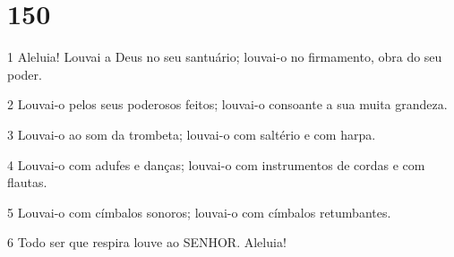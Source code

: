 \chapter{150}

\par 1 Aleluia! Louvai a Deus no seu santuário; louvai-o no firmamento, obra do seu poder.
\par 2 Louvai-o pelos seus poderosos feitos; louvai-o consoante a sua muita grandeza.
\par 3 Louvai-o ao som da trombeta; louvai-o com saltério e com harpa.
\par 4 Louvai-o com adufes e danças; louvai-o com instrumentos de cordas e com flautas.
\par 5 Louvai-o com címbalos sonoros; louvai-o com címbalos retumbantes.
\par 6 Todo ser que respira louve ao SENHOR. Aleluia!


